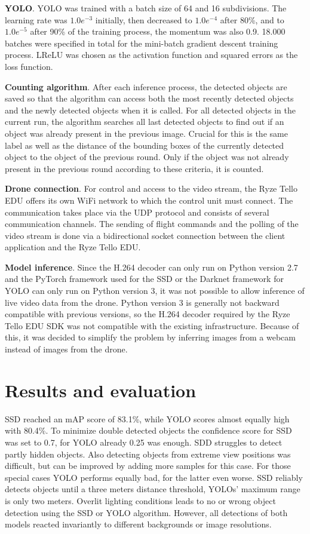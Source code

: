 \documentclass[a4paper, 10pt, journal]{wissarbIEEE}      %
\begin{document}
\textbf{YOLO}. YOLO was trained with a batch size of 64 and 16 subdivisions. The learning rate was $1.0e^{-3}$ initially, then decreased to $1.0e^{-4}$ after 80\%, and to $1.0e^{-5}$ after 90\% of the training process, the momentum was also 0.9. 18.000 batches were specified in total for the mini-batch gradient descent training process. LReLU was chosen as the activation function and squared errors as the loss function.

\textbf{Counting algorithm}. After each inference process, the detected objects are saved so that the algorithm can access both the most recently detected objects and the newly detected objects when it is called. For all detected objects in the current run, the algorithm searches all last detected objects to find out if an object was already present in the previous image. Crucial for this is the same label as well as the distance of the bounding boxes of the currently detected object to the object of the previous round. Only if the object was not already present in the previous round according to these criteria, it is counted.

\textbf{Drone connection}. For control and access to the video stream, the Ryze Tello EDU offers its own WiFi network to which the control unit must connect. The communication takes place via the UDP protocol and consists of several communication channels. The sending of flight commands and the polling of the video stream is done via a bidirectional socket connection between the client application and the Ryze Tello EDU.

\textbf{Model inference}. Since the H.264 decoder can only run on Python version 2.7 and the PyTorch framework used for the SSD or the Darknet framework for YOLO can only run on Python version 3, it was not possible to allow inference of live video data from the drone. Python version 3 is generally not backward compatible with previous versions, so the H.264 decoder required by the Ryze Tello EDU SDK was not compatible with the existing infrastructure. Because of this, it was decided to simplify the problem by inferring images from a webcam instead of images from the drone.

\section{Results and evaluation} \label{evaluation}

SSD reached an mAP score of 83.1\%, while YOLO scores almost equally high with 80.4\%. To minimize double detected objects the confidence score for SSD was set to 0.7, for YOLO already 0.25 was enough. SDD struggles to detect partly hidden objects. Also detecting objects from extreme view positions was difficult, but can be improved by adding more samples for this case. For those special cases YOLO performs equally bad, for the latter even worse. SSD reliably detects objects until a three meters distance threshold, YOLOs' maximum range is only two meters. Overlit lighting conditions leads to no or wrong object detection using the SSD or YOLO algorithm. However, all detections of both models reacted invariantly to different backgrounds or image resolutions. 
\end{document}
